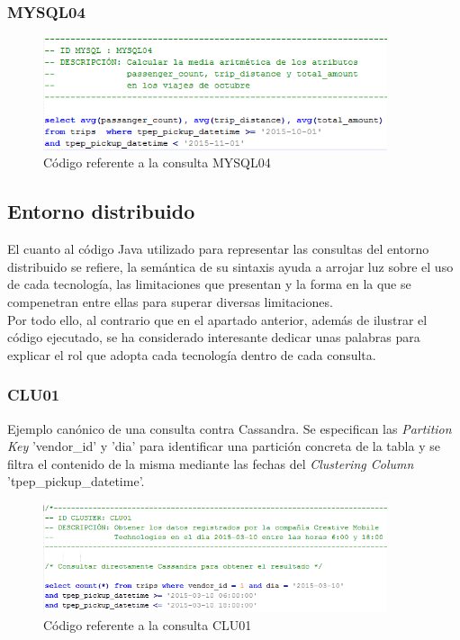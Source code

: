 \subsubsection[]{MYSQL04}

\begin{figure}[h]
	\centering
	\includegraphics[width=0.9\textwidth]{Ilustraciones/MYSQL04.png}
	\caption{Código referente a la consulta MYSQL04}
\end{figure}

\clearpage

\subsection{Entorno distribuido}

El cuanto al código Java utilizado para representar las consultas del entorno distribuido se refiere, la semántica de su sintaxis ayuda a arrojar luz sobre el uso de cada tecnología, las limitaciones que presentan y la forma en la que se compenetran entre ellas para superar diversas limitaciones.\\

Por todo ello, al contrario que en el apartado anterior, además de ilustrar el código ejecutado, se ha considerado interesante dedicar unas palabras para explicar el rol que adopta cada tecnología dentro de cada consulta.\\

\subsubsection[]{CLU01}

Ejemplo canónico de una consulta contra Cassandra. Se especifican las \textit{Partition Key} 'vendor\_id' y 'dia' para identificar una partición concreta de la tabla y se filtra el contenido de la misma mediante las fechas del \textit{Clustering Column} 'tpep\_pickup\_datetime'.\\

\begin{figure}[h]
	\centering
	\includegraphics[width=0.9\textwidth]{Ilustraciones/CLU01.png}
	\caption{Código referente a la consulta CLU01}
\end{figure}

